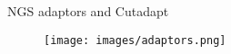 \documentclass{beamer}
\begin{document}
\begin{frame}{NGS adaptors and Cutadapt}

\begin{figure}[htbp]
\centering
\texttt{[image: images/adaptors.png]}

\end{figure}

\end{frame}


  






  
  

    
    
  


\end{document}
